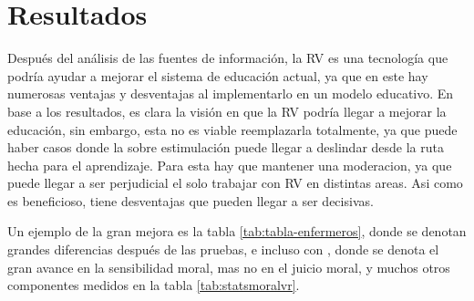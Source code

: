 \section{Resultados}

Después del análisis de las fuentes de información, la RV es una tecnología que podría ayudar a mejorar el sistema de educación actual, ya que en este hay numerosas ventajas y desventajas al implementarlo en un modelo educativo.
En base a los resultados, es clara la visión en que la RV podría llegar a mejorar la educación, sin embargo, esta no es viable reemplazarla totalmente, ya que puede haber casos donde la sobre estimulación puede llegar a deslindar desde la ruta hecha para el aprendizaje. Para esta hay que mantener una moderacion, ya que puede llegar a ser perjudicial el solo trabajar con RV en distintas areas. Asi como es beneficioso, tiene desventajas que pueden llegar a ser decisivas.

Un ejemplo de la gran mejora es la tabla \ref{tab:tabla-enfermeros}, donde se denotan grandes diferencias despu{\'e}s de las pruebas, e incluso con \textcite{SHIM2023100010}, donde se denota el gran avance en la sensibilidad moral, mas no en el juicio moral, y muchos otros componentes medidos en la tabla \ref{tab:statsmoralvr}.
